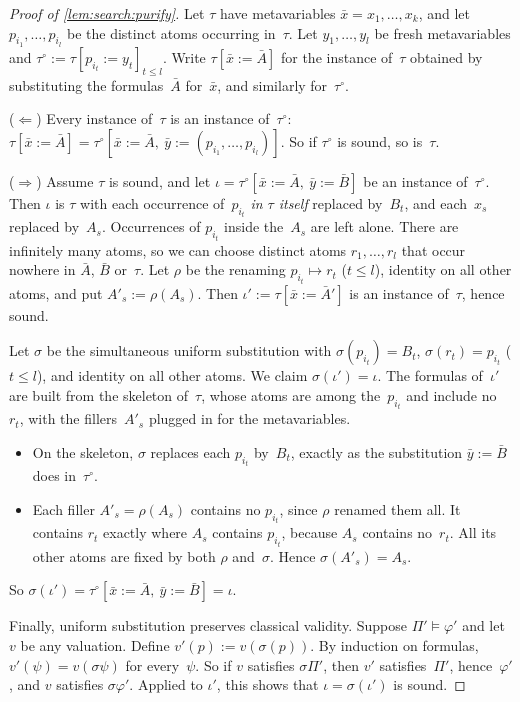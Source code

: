 \begin{proof}[Proof of \cref{lem:search:purify}]
Let $\tau$ have metavariables $\bar x=x_1,\dots,x_k$, and let $p_{i_1},\dots,p_{i_l}$ be the distinct atoms occurring in~$\tau$. Let $y_1,\dots,y_l$ be fresh metavariables and $\tau^\circ:=\tau[p_{i_t}:=y_t]_{t\le l}$. Write $\tau[\bar x:=\bar A]$ for the instance of~$\tau$ obtained by substituting the formulas~$\bar A$ for~$\bar x$, and similarly for~$\tau^\circ$.

($\Leftarrow$) Every instance of~$\tau$ is an instance of~$\tau^\circ$: $\tau[\bar x:=\bar A]=\tau^\circ[\bar x:=\bar A,\ \bar y:=(p_{i_1},\dots,p_{i_l})]$. So if $\tau^\circ$ is sound, so is~$\tau$.

($\Rightarrow$) Assume $\tau$ is sound, and let $\iota=\tau^\circ[\bar x:=\bar A,\ \bar y:=\bar B]$ be an instance of~$\tau^\circ$. Then $\iota$ is $\tau$ with each occurrence of~$p_{i_t}$ \emph{in $\tau$ itself} replaced by~$B_t$, and each~$x_s$ replaced by~$A_s$. Occurrences of $p_{i_t}$ inside the~$A_s$ are left alone. There are infinitely many atoms, so we can choose distinct atoms $r_1,\dots,r_l$ that occur nowhere in $\bar A$, $\bar B$ or~$\tau$. Let $\rho$ be the renaming $p_{i_t}\mapsto r_t$ ($t\le l$), identity on all other atoms, and put $A'_s:=\rho(A_s)$. Then $\iota':=\tau[\bar x:=\bar A']$ is an instance of~$\tau$, hence sound.

Let $\sigma$ be the simultaneous uniform substitution with $\sigma(p_{i_t})=B_t$, $\sigma(r_t)=p_{i_t}$ ($t\le l$), and identity on all other atoms. We claim $\sigma(\iota')=\iota$. The formulas of~$\iota'$ are built from the skeleton of~$\tau$, whose atoms are among the~$p_{i_t}$ and include no~$r_t$, with the fillers~$A'_s$ plugged in for the metavariables.
\begin{itemize}
\item On the skeleton, $\sigma$ replaces each $p_{i_t}$ by~$B_t$, exactly as the substitution $\bar y:=\bar B$ does in~$\tau^\circ$.
\item Each filler $A'_s=\rho(A_s)$ contains no $p_{i_t}$, since $\rho$ renamed them all. It contains $r_t$ exactly where $A_s$ contains $p_{i_t}$, because $A_s$ contains no~$r_t$. All its other atoms are fixed by both $\rho$ and~$\sigma$. Hence $\sigma(A'_s)=A_s$.
\end{itemize}
So $\sigma(\iota')=\tau^\circ[\bar x:=\bar A,\ \bar y:=\bar B]=\iota$.

Finally, uniform substitution preserves classical validity. Suppose $\Pi'\models\varphi'$ and let~$v$ be any valuation. Define $v'(p):=v(\sigma(p))$. By induction on formulas, $v'(\psi)=v(\sigma\psi)$ for every~$\psi$. So if $v$ satisfies $\sigma\Pi'$, then $v'$ satisfies~$\Pi'$, hence~$\varphi'$, and $v$ satisfies $\sigma\varphi'$. Applied to $\iota'$, this shows that $\iota=\sigma(\iota')$ is sound.
\end{proof}

